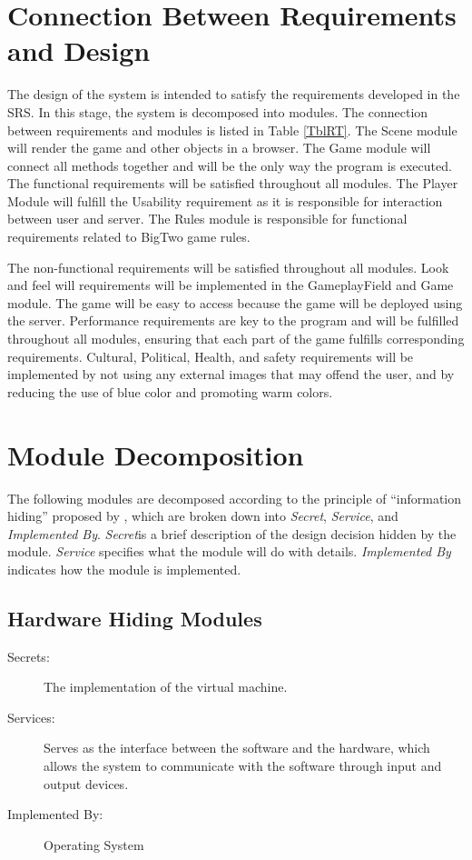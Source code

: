 \documentclass[12pt, titlepage]{article}
\begin{document}
\section{Connection Between Requirements and Design} \label{SecConnection}

The design of the system is intended to satisfy the requirements developed in
the SRS. In this stage, the system is decomposed into modules. The connection
between requirements and modules is listed in Table \ref{TblRT}. The Scene module will render the game and other objects in a browser. The Game module will connect all methods together and will be the only way the program is executed. The functional requirements will be satisfied throughout all modules. The Player Module will fulfill the Usability requirement as it is responsible for interaction between user and server. The Rules module is responsible for functional requirements related to BigTwo game rules. 

\noindent The non-functional requirements will be satisfied throughout all modules.
Look and feel will requirements will be implemented in the GameplayField and Game module. The game will be easy to access because the game will be deployed using the server. Performance requirements are key to the program and will be fulfilled throughout all modules, ensuring that each part of the game fulfills corresponding requirements. Cultural, Political, Health, and safety requirements will be implemented by not using any external images that may offend the user, and by reducing the use of blue color and promoting warm colors.

\section{Module Decomposition} \label{SecMD}

The following modules are decomposed according to the principle of ``information hiding'' proposed by \citet{ParnasEtAl1984}, which are broken down into \emph{Secret}, \emph{Service}, and \emph{Implemented By}. \emph{Secret}is a brief description of the design decision hidden by the module. \emph{Service} specifies what the module will do with details. \emph{Implemented By} indicates how the module is implemented. 

\subsection{Hardware Hiding Modules}

\begin{description}
\item[Secrets:]The implementation of the virtual machine.
\item[Services:]Serves as the interface between the software and the hardware, which allows the system to communicate with the software through input and output devices.  
\item[Implemented By:] Operating System
\end{description}
\end{document}

